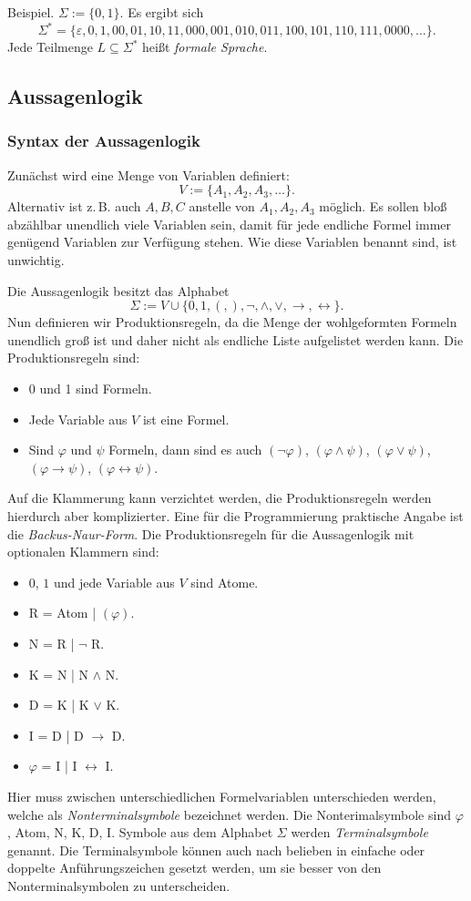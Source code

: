 \documentclass[a4paper,11pt,fleqn,twoside]{scrartcl}
\numberwithin{equation}{section}
\newcommand{\emdef}[1]{\emph{#1}}
\newcommand{\bitem}{\item[\scriptsize\color{gray1}$\blacksquare$]}
\begin{document}
Beispiel. $\Sigma:=\{0,1\}$. Es ergibt sich
\begin{equation}
\Sigma^* = \{\varepsilon,0,1,00,01,10,11,000,001,010,011,100,101,110,111,0000,\ldots\}.
\end{equation}
Jede Teilmenge $L\subseteq\Sigma^*$ heißt \emdef{formale Sprache}.

\subsection{Aussagenlogik}
\subsubsection{Syntax der Aussagenlogik}
Zunächst wird eine Menge von Variablen definiert:
\begin{equation}
V:=\{A_1,A_2,A_3,\ldots\}.
\end{equation}
Alternativ ist z.\,B. auch $A,B,C$ anstelle von $A_1,A_2,A_3$ möglich.
Es sollen bloß abzählbar unendlich viele Variablen sein, damit
für jede endliche Formel immer genügend Variablen zur Verfügung
stehen. Wie diese Variablen benannt sind, ist unwichtig.

Die Aussagenlogik besitzt das Alphabet
\begin{equation}
\Sigma := V\cup\{0,1,(,),\neg,\land,\lor,\rightarrow,\leftrightarrow\}.
\end{equation}
Nun definieren wir Produktionsregeln, da die Menge der wohlgeformten
Formeln unendlich groß ist und daher nicht als endliche Liste
aufgelistet werden kann. Die Produktionsregeln sind:
\begin{itemize}[noitemsep,topsep=2pt]
\setlength\itemsep{4pt}
\bitem 0 und 1 sind Formeln.
\bitem Jede Variable aus $V$ ist eine Formel.
\bitem Sind $\varphi$ und $\psi$ Formeln, dann sind es auch
   $(\neg \varphi)$, $(\varphi\land\psi)$, $(\varphi\lor\psi)$,
   $(\varphi\rightarrow\psi)$, $(\varphi\leftrightarrow\psi)$.
\end{itemize}
Auf die Klammerung kann verzichtet werden, die Produktionsregeln
werden hierdurch aber komplizierter. Eine für die Programmierung
praktische Angabe ist die \emdef{Backus-Naur-Form}. Die
Produktionsregeln für die Aussagenlogik mit optionalen Klammern sind:
\begin{itemize}[noitemsep,topsep=2pt]
\setlength\itemsep{4pt}
\bitem $0$, $1$ und jede Variable aus $V$ sind Atome.
\bitem R = Atom | $(\varphi)$.
\bitem N = R | $\neg$ R.
\bitem K = N | N $\land$ N.
\bitem D = K | K $\lor$ K.
\bitem I = D | D $\rightarrow$ D.
\bitem $\varphi$ = I | I $\leftrightarrow$ I.
\end{itemize}
\pagebreak[2]
Hier muss zwischen unterschiedlichen Formelvariablen unterschieden
werden, welche als \emdef{Nonterminalsymbole} bezeichnet werden.
Die Nonterimalsymbole sind $\varphi$, Atom, N, K, D, I.
Symbole aus dem Alphabet $\Sigma$ werden \emdef{Terminalsymbole}
genannt. Die Terminalsymbole können auch nach belieben in einfache
oder doppelte Anführungszeichen gesetzt werden, um sie besser
von den Nonterminalsymbolen zu unterscheiden.
\end{document}
